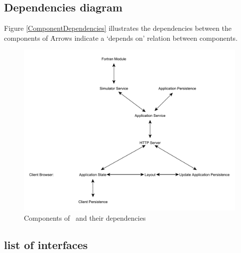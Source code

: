 \subsection{Dependencies diagram}
\label{subsec:depdiag}
Figure \ref{ComponentDependencies} illustrates the dependencies between the components of \projectname\. Arrows indicate a `depends on' relation between components.

\noindent
\begin{figure}
	\centering
	\includegraphics[width=\textwidth]{ComponentDependencies}
	\caption{Components of \projectname\ and their dependencies}
	\label{fig:tierchannel}
\end{figure}

\subsection{list of interfaces}
\label{subsec:compinterfaces}




